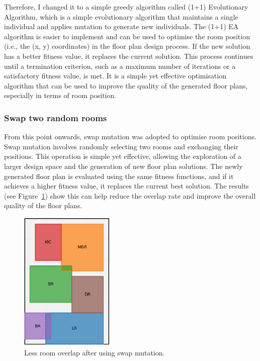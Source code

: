 \documentclass[]{article}
\begin{document}
Therefore, I changed it to a simple greedy algorithm called (1+1) Evolutionary Algorithm, which is a simple evolutionary algorithm that maintains a single individual and applies mutation to generate new individuals. The (1+1) EA algorithm is easier to implement and can be used to optimise the room position (i.e., the (x, y) coordinates) in the floor plan design process. If the new solution has a better fitness value, it replaces the current solution. This process continues until a termination criterion, such as a maximum number of iterations or a satisfactory fitness value, is met. It is a simple yet effective optimisation algorithm that can be used to improve the quality of the generated floor plans, especially in terms of room position.

\subsubsection{Swap two random rooms}
From this point onwards, swap mutation was adopted to optimise room positions. Swap mutation involves randomly selecting two rooms and exchanging their positions. This operation is simple yet effective, allowing the exploration of a larger design space and the generation of new floor plan solutions. The newly generated floor plan is evaluated using the same fitness functions, and if it achieves a higher fitness value, it replaces the current best solution. The results (see Figure~\ref{fig:swap-rooms}) show this can help reduce the overlap rate and improve the overall quality of the floor plans.

\begin{figure}[h]
    \centering
    \includegraphics[width=0.4\textwidth]{images/swap-rooms.png}
    \caption{Less room overlap after using swap mutation.}
    \label{fig:swap-rooms}
\end{figure}
\end{document}
